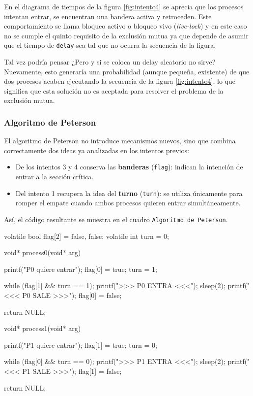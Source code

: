En el diagrama de tiempos de la figura \ref{fig:intento4} se aprecia que los procesos intentan entrar, se encuentran una bandera activa y retroceden. Este comportamiento se llama bloqueo activo o bloqueo vivo (\emph{live-lock}) y en este caso no se cumple el quinto requisito de la exclusión mutua ya que depende de asumir que el tiempo de \texttt{delay} sea tal que no ocurra la secuencia de la figura.

Tal vez podría pensar ¿Pero y si se coloca un delay aleatorio no sirve? Nuevamente, esto generaría una probabilidad (aunque pequeña, existente) de que dos procesos acaben ejecutando la secuencia de la figura \ref{fig:intento4}, lo que significa que esta solución no es aceptada para resolver el problema de la exclusión mutua.

\subsubsection{Algoritmo de Peterson}

El algoritmo de Peterson no introduce mecanismos nuevos, sino que combina correctamente dos ideas ya analizadas en los intentos previos:
\begin{itemize}
  \item De los intentos 3 y 4 conserva las \textbf{banderas} (\texttt{flag}): indican la intención de entrar a la sección crítica.
  \item Del intento 1 recupera la idea del \textbf{turno} (\texttt{turn}): se utiliza únicamente para romper el empate cuando ambos procesos quieren entrar simultáneamente.
\end{itemize}
Así, el código resultante se muestra en el cuadro \texttt{Algoritmo de Peterson}.
\begin{ccode}[title=Algoritmo de Peterson]
volatile bool flag[2] = {false, false};
volatile int turn = 0;

void* process0(void* arg) {
    printf("P0 quiere entrar\n");
    flag[0] = true;
    turn = 1;

    while (flag[1] && turn == 1);
    printf(">>> P0 ENTRA <<<\n");
    sleep(2);
    printf("<<< P0 SALE >>>\n\n");
    flag[0] = false;

    return NULL;
}

void* process1(void* arg) {
    printf("P1 quiere entrar\n");
    flag[1] = true;
    turn = 0;

    while (flag[0] && turn == 0);
    printf(">>> P1 ENTRA <<<\n");
    sleep(2);
    printf("<<< P1 SALE >>>\n\n");
    flag[1] = false;

    return NULL;
}
\end{ccode}


